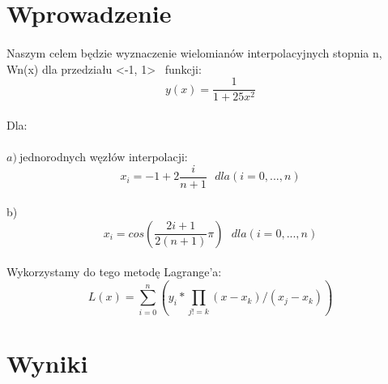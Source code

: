 \documentclass{article}
\begin{document}
\section{Wprowadzenie}

\paragraph{}

Naszym celem będzie wyznaczenie wielomianów interpolacyjnych stopnia n, Wn(x) 
dla przedziału <-1, 1> \
funkcji: \begin{equation} y(x) = \frac{1}{1 + 25x^2} \end{equation}

\paragraph{}
Dla: 

\paragraph{}
$a)\ $jednorodnych węzłów interpolacji: 
\begin{equation*}
    x_i = -1 + 2\frac{i}{n+1}\ \ \ dla (i=0, ... , n)
\end{equation*}

\paragraph{}
b) 
\begin{equation}
 x_i = cos(\frac{2i+1}{2(n+1)}\pi) \ \ \ dla (i=0, ... , n)
\end{equation}

\paragraph{}
Wykorzystamy do tego metodę Lagrange'a:
\begin{equation}
 L(x) = \sum_{i=0}^{n} (y_i * \prod_{j!=k}^{}(x-x_k) / (x_j - x_k))
\end{equation}

\medskip
\section{Wyniki}


\paragraph{}
\end{document}
